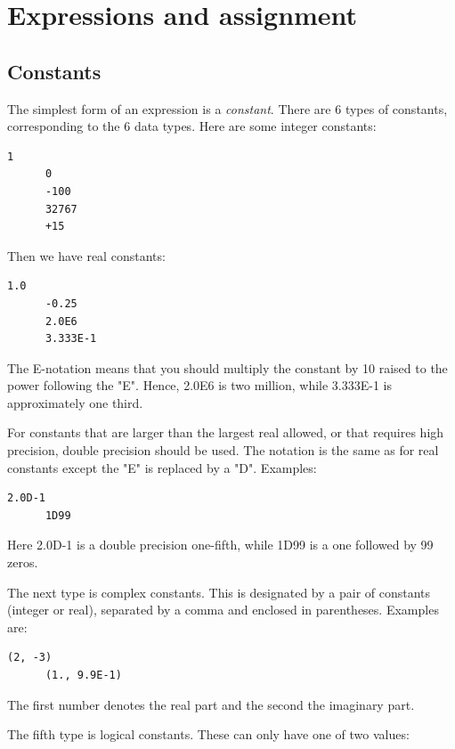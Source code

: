 \chapter{Expressions and assignment}

\section{Constants}

The simplest form of an expression is a \emph{constant}. There are 6 types of constants, corresponding to the 6 data types. Here are some integer constants:

\begin{lstlisting}[style=fortran77]
      1
      0
      -100
      32767
      +15
\end{lstlisting}

Then we have real constants:

\begin{lstlisting}[style=fortran77]
      1.0
      -0.25
      2.0E6
      3.333E-1
\end{lstlisting}

The E-notation means that you should multiply the constant by 10 raised to the power following the "E". Hence, 2.0E6 is two million, while 3.333E-1 is approximately one third.

For constants that are larger than the largest real allowed, or that requires high precision, double precision should be used. The notation is the same as for real constants except the "E" is replaced by a "D". Examples:

\begin{lstlisting}[style=fortran77]
      2.0D-1
      1D99
\end{lstlisting}

Here 2.0D-1 is a double precision one-fifth, while 1D99 is a one followed by 99 zeros.

The next type is complex constants. This is designated by a pair of constants (integer or real), separated by a comma and enclosed in parentheses. Examples are:

\begin{lstlisting}[style=fortran77]
      (2, -3)
      (1., 9.9E-1)
\end{lstlisting}

The first number denotes the real part and the second the imaginary part.

The fifth type is logical constants. These can only have one of two values:

